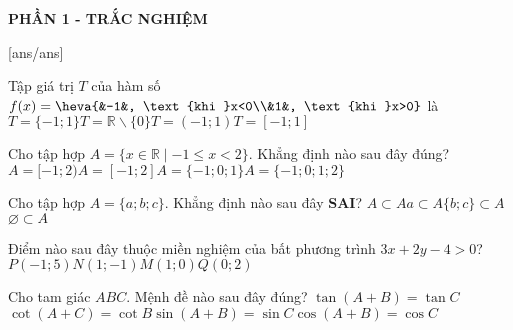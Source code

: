 
\begin{center}
	\textbf{PHẦN 1 - TRẮC NGHIỆM}
\end{center}
[ans/ans]

\begin{ex}%
	Tập giá trị $T$ của hàm số $f(x)=\heva{&-1&, \text{khi }x<0\\&1&, \text{khi }x>0}$ là
	\choice
	{\True $T=\{-1 ; 1\}$}{$T=\mathbb{R} \backslash\{0\}$}{$T=(-1 ; 1)$}{$T=[-1 ; 1]$}
\end{ex}

\begin{ex}%
	Cho tập hợp $A=\{x \in \mathbb{R} \mid -1 \leq x<2\}$. Khẳng định nào sau đây đúng?
	\choice
	{\True $A=[-1 ; 2)$}{$A=[-1 ; 2]$}{$A=\{-1 ; 0 ; 1\}$}{$A=\{-1 ; 0 ; 1 ; 2\}$}
	\loigiai{
		Ta có  $A=[-1 ; 2)$.
	}
\end{ex}

\begin{ex}%
	Cho tập hợp $A=\{a ; b ; c\}$. Khẳng định nào sau đây \textbf{SAI}?
	\choice
	{$A \subset A$}{\True $a \subset A$}{$\{b ; c\} \subset A$}{$\varnothing \subset A$}
\end{ex}

\begin{ex}%
	Điểm nào sau đây thuộc miền nghiệm của bất phương trình $3 x+2 y-4>0$?
	\choice
	{\True $P(-1 ; 5)$}{$N(1 ;-1)$}{$M(1 ; 0)$}{$Q(0 ; 2)$}
\end{ex}

\begin{ex}%
	Cho tam giác $ABC$. Mệnh đề nào sau đây đúng?
	\choice
	{$\tan (A+B)=\tan C$}{$\cot (A+C)=\cot B$}{\True $\sin (A+B)=\sin C$}{$\cos (A+B)=\cos C$}
\end{ex}


